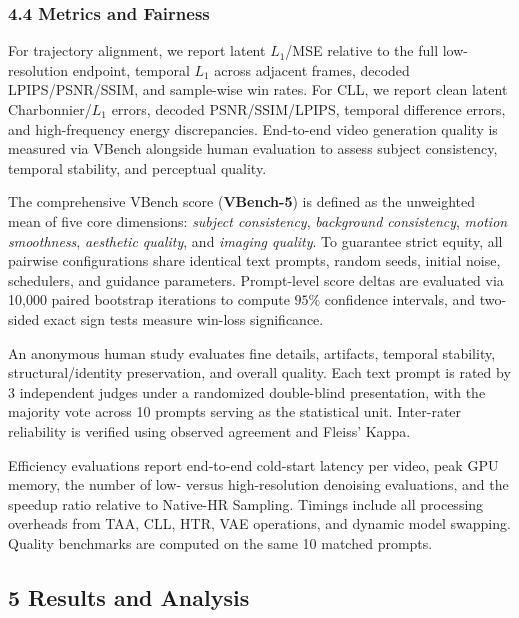 \hypertarget{metrics-and-fairness}{%
\subsubsection{4.4 Metrics and Fairness}\label{metrics-and-fairness}}

For trajectory alignment, we report latent \(L_1\)/MSE relative to the full low-resolution endpoint, temporal \(L_1\) across adjacent frames, decoded LPIPS/PSNR/SSIM, and sample-wise win rates. For CLL, we report clean latent Charbonnier/\(L_1\) errors, decoded PSNR/SSIM/LPIPS, temporal difference errors, and high-frequency energy discrepancies. End-to-end video generation quality is measured via VBench alongside human evaluation to assess subject consistency, temporal stability, and perceptual quality.

The comprehensive VBench score (\textbf{VBench-5}) is defined as the unweighted mean of five core dimensions: \emph{subject consistency}, \emph{background consistency}, \emph{motion smoothness}, \emph{aesthetic quality}, and \emph{imaging quality}. To guarantee strict equity, all pairwise configurations share identical text prompts, random seeds, initial noise, schedulers, and guidance parameters. Prompt-level score deltas are evaluated via 10,000 paired bootstrap iterations to compute \(95\%\) confidence intervals, and two-sided exact sign tests measure win-loss significance.

An anonymous human study evaluates fine details, artifacts, temporal stability, structural/identity preservation, and overall quality. Each text prompt is rated by 3 independent judges under a randomized double-blind presentation, with the majority vote across 10 prompts serving as the statistical unit. Inter-rater reliability is verified using observed agreement and Fleiss' Kappa.

Efficiency evaluations report end-to-end cold-start latency per video, peak GPU memory, the number of low- versus high-resolution denoising evaluations, and the speedup ratio relative to Native-HR Sampling. Timings include all processing overheads from TAA, CLL, HTR, VAE operations, and dynamic model swapping. Quality benchmarks are computed on the same 10 matched prompts.

\hypertarget{results-and-analysis}{%
\subsection{5 Results and Analysis}\label{results-and-analysis}}

